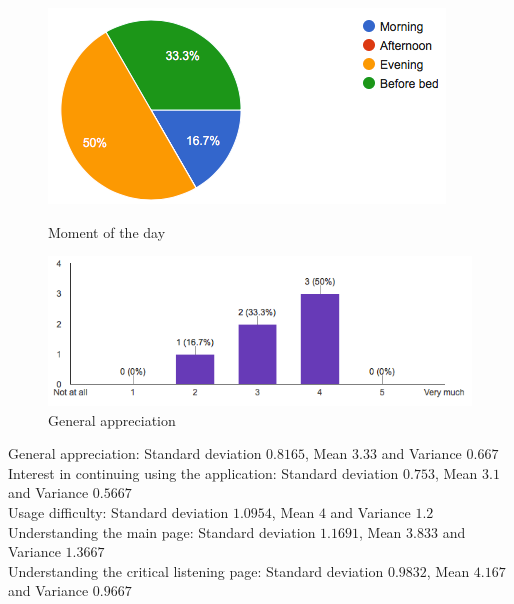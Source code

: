 \begin{figure}[!ht]
	\centering
	\begin{minipage}{.5\textwidth}
		\centering
		\includegraphics[scale=0.5]{Figures/responses/application_period_of_usage.png}
		\caption{Moment of the day}
		\label{fig:int_improving_lang}
	\end{minipage}%
	\begin{minipage}{.5\textwidth}
		\centering
		\includegraphics[scale=0.5]{Figures/responses/application_liked.png}
		\caption{General appreciation}
		\label{fig:int_usage_smartphone}
	\end{minipage}%
\end{figure}

\noindent General appreciation: Standard deviation $0.8165$, Mean $3.33$ and Variance $0.667$ \\
\noindent Interest in continuing using the application: Standard deviation $0.753$, Mean $3.1$ and Variance $0.5667$ \\
\noindent Usage difficulty: Standard deviation $1.0954$, Mean $4$ and Variance $1.2$ \\
\noindent Understanding the main page: Standard deviation $1.1691$, Mean $3.833$ and Variance $1.3667$ \\
\noindent Understanding the critical listening page: Standard deviation $0.9832$, Mean $4.167$ and Variance $0.9667$

